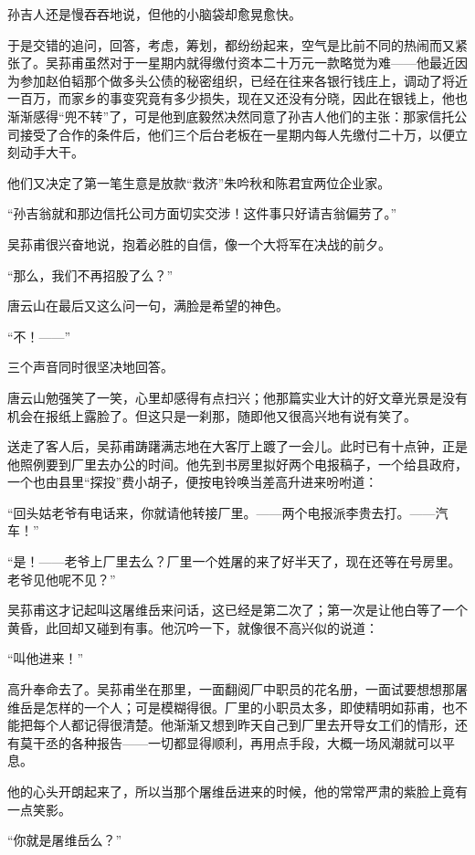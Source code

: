 \par 孙吉人还是慢吞吞地说，但他的小脑袋却愈晃愈快。
\par 于是交错的追问，回答，考虑，筹划，都纷纷起来，空气是比前不同的热闹而又紧张了。吴荪甫虽然对于一星期内就得缴付资本二十万元一款略觉为难——他最近因为参加赵伯韬那个做多头公债的秘密组织，已经在往来各银行钱庄上，调动了将近一百万，而家乡的事变究竟有多少损失，现在又还没有分晓，因此在银钱上，他也渐渐感得“兜不转”了，可是他到底毅然决然同意了孙吉人他们的主张：那家信托公司接受了合作的条件后，他们三个后台老板在一星期内每人先缴付二十万，以便立刻动手大干。
\par 他们又决定了第一笔生意是放款“救济”朱吟秋和陈君宜两位企业家。
\par “孙吉翁就和那边信托公司方面切实交涉！这件事只好请吉翁偏劳了。”
\par 吴荪甫很兴奋地说，抱着必胜的自信，像一个大将军在决战的前夕。
\par “那么，我们不再招股了么？”
\par 唐云山在最后又这么问一句，满脸是希望的神色。
\par “不！——”
\par 三个声音同时很坚决地回答。
\par 唐云山勉强笑了一笑，心里却感得有点扫兴；他那篇实业大计的好文章光景是没有机会在报纸上露脸了。但这只是一刹那，随即他又很高兴地有说有笑了。
\par 送走了客人后，吴荪甫踌躇满志地在大客厅上踱了一会儿。此时已有十点钟，正是他照例要到厂里去办公的时间。他先到书房里拟好两个电报稿子，一个给县政府，一个也由县里“探投”费小胡子，便按电铃唤当差高升进来吩咐道：
\par “回头姑老爷有电话来，你就请他转接厂里。——两个电报派李贵去打。——汽车！”
\par “是！——老爷上厂里去么？厂里一个姓屠的来了好半天了，现在还等在号房里。老爷见他呢不见？”
\par 吴荪甫这才记起叫这屠维岳来问话，这已经是第二次了；第一次是让他白等了一个黄昏，此回却又碰到有事。他沉吟一下，就像很不高兴似的说道：
\par “叫他进来！”
\par 高升奉命去了。吴荪甫坐在那里，一面翻阅厂中职员的花名册，一面试要想想那屠维岳是怎样的一个人；可是模糊得很。厂里的小职员太多，即使精明如荪甫，也不能把每个人都记得很清楚。他渐渐又想到昨天自己到厂里去开导女工们的情形，还有莫干丞的各种报告——一切都显得顺利，再用点手段，大概一场风潮就可以平息。
\par 他的心头开朗起来了，所以当那个屠维岳进来的时候，他的常常严肃的紫脸上竟有一点笑影。
\par “你就是屠维岳么？”
